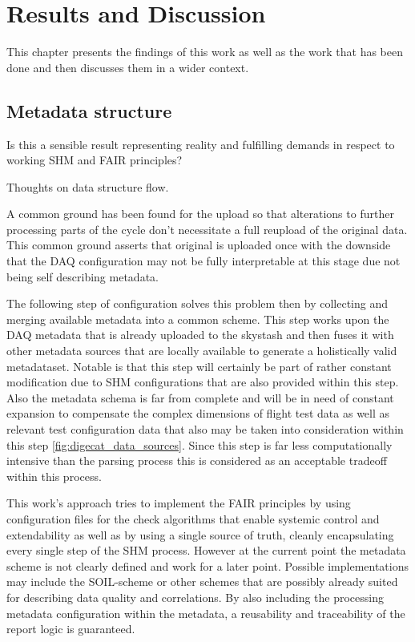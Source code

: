 \chapter{Results and Discussion}
This chapter presents the findings of this work as well as the work that has been done and then discusses them in a wider context.

\section{Metadata structure}


Is this a sensible result representing reality and fulfilling demands in respect to working SHM and FAIR principles?

Thoughts on data structure flow.

A common ground has been found for the upload so that alterations to further processing parts of the cycle don't necessitate a full reupload of the original data. This common ground asserts that original is uploaded once with the downside that the DAQ configuration may not be fully interpretable at this stage due not being self describing metadata.

The following step of configuration solves this problem then by collecting and merging available metadata into a common scheme. This step works upon the DAQ metadata that is already uploaded to the skystash and then fuses it with other metadata sources that are locally available to generate a holistically valid metadataset. Notable is that this step will certainly be part of rather constant modification due to SHM configurations that are also provided within this step. Also the metadata schema is far from complete and will be in need of constant expansion to compensate the complex dimensions of flight test data as well as relevant test configuration data that also may be taken into consideration within this step \ref{fig:digecat_data_sources}. Since this step is far less computationally intensive than the parsing process this is considered as an acceptable tradeoff within this process.

This work's approach tries to implement the FAIR principles by using configuration files for the check algorithms that enable systemic control and extendability as well as by using a single source of truth, cleanly encapsulating every single step of the SHM process. However at the current point the metadata scheme is not clearly defined and work for a later point. Possible implementations may include the SOIL-scheme or other schemes that are possibly already suited for describing data quality and correlations. By also including the processing metadata configuration within the metadata, a reusability and traceability of the report logic is guaranteed.

